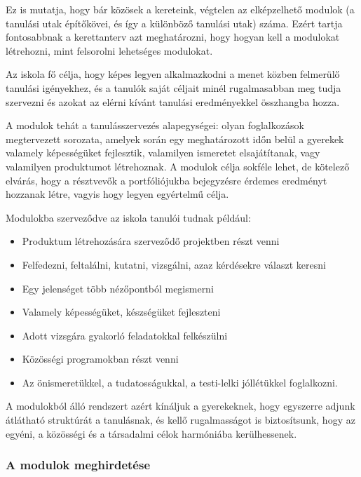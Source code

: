 Ez is mutatja, hogy bár közösek a kereteink, végtelen az elképzelhető
modulok (a tanulási utak építőkövei, és így a különböző tanulási utak)
száma. Ezért tartja fontosabbnak a kerettanterv azt meghatározni, hogy
hogyan kell a modulokat létrehozni, mint felsorolni lehetséges
modulokat.

Az iskola fő célja, hogy képes legyen alkalmazkodni a menet közben
felmerülő tanulási igényekhez, és a tanulók saját céljait minél
rugalmasabban meg tudja szervezni és azokat az elérni kívánt tanulási
eredményekkel összhangba hozza.

A modulok tehát a tanulásszervezés alapegységei: olyan foglalkozások
megtervezett sorozata, amelyek során egy meghatározott időn belül a
gyerekek valamely képességüket fejlesztik, valamilyen ismeretet
elsajátítanak, vagy valamilyen produktumot létrehoznak. A modulok célja
sokféle lehet, de kötelező elvárás, hogy a résztvevők a portfóliójukba
bejegyzésre érdemes eredményt hozzanak létre, vagyis hogy legyen
egyértelmű célja.

Modulokba szerveződve az iskola tanulói tudnak például:

\begin{itemize}
  \item Produktum létrehozására szerveződő projektben részt venni

  \item Felfedezni, feltalálni, kutatni, vizsgálni, azaz kérdésekre választ
        keresni

  \item Egy jelenséget több nézőpontból megismerni

  \item Valamely képességüket, készségüket fejleszteni

  \item Adott vizsgára gyakorló feladatokkal felkészülni

  \item Közösségi programokban részt venni

  \item Az önismeretükkel, a tudatosságukkal, a testi-lelki jóllétükkel
        foglalkozni.
\end{itemize}

A modulokból álló rendszert azért kínáljuk a gyerekeknek, hogy egyszerre
adjunk átlátható struktúrát a tanulásnak, és kellő rugalmasságot is
biztosítsunk, hogy az egyéni, a közösségi és a társadalmi célok
harmóniába kerülhessenek.

\subsubsection{A modulok meghirdetése}

